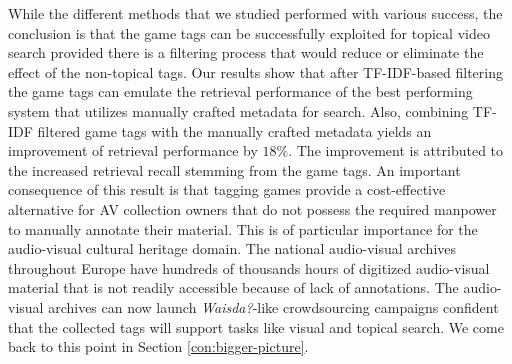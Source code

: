 While the different methods that we studied performed with various success, the conclusion is that the
game tags can be successfully exploited for topical video search provided there is a filtering process that would reduce or eliminate the effect of the non-topical tags. Our results show that after TF-IDF-based filtering the game tags can emulate the retrieval performance of the best performing system that utilizes manually crafted metadata for search. Also, combining TF-IDF filtered game tags with the manually crafted metadata yields an improvement of retrieval performance by $18\%$. The improvement is attributed to the increased retrieval recall stemming from the game tags. An important consequence of this result is that tagging games provide a cost-effective alternative for AV collection owners that do not possess the required manpower to manually annotate their material. This is of particular importance for the audio-visual cultural heritage domain. The national audio-visual archives throughout Europe have hundreds of thousands hours of digitized audio-visual material that is not readily accessible because of lack of annotations. The audio-visual archives can now launch \textit{Waisda?}-like crowdsourcing campaigns confident that the collected tags will support tasks like visual and topical search. We come back to this point in Section \ref{con:bigger-picture}.
 

